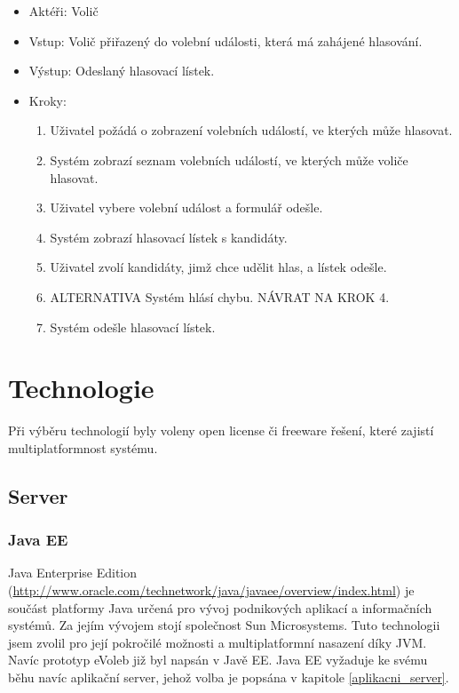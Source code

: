 \documentclass[11pt,twoside,a4paper]{book}
\begin{document}
\begin{itemize}
\item Aktéři: Volič
\item Vstup: Volič přiřazený do volební události, která má zahájené hlasování.
\item Výstup: Odeslaný hlasovací lístek.
\item Kroky:
	\begin{enumerate}
		\item Uživatel požádá o zobrazení volebních událostí, ve kterých může hlasovat.
		\item Systém zobrazí seznam volebních událostí, ve kterých může voliče hlasovat.
		\item Uživatel vybere volební událost a formulář odešle.
		\item Systém zobrazí hlasovací lístek s kandidáty.
		\item Uživatel zvolí kandidáty, jimž chce udělit hlas, a lístek odešle.	
		\item ALTERNATIVA Systém hlásí chybu. NÁVRAT NA KROK 4.
		\item Systém odešle hlasovací lístek.
	\end{enumerate}
\end{itemize}


\section{Technologie}

Při výběru technologií byly voleny open license či freeware řešení, které zajistí multiplatformnost systému.

\subsection{Server}

\subsubsection{Java EE}

Java Enterprise Edition (\url{http://www.oracle.com/technetwork/java/javaee/overview/index.html}) je součást platformy Java určená pro vývoj podnikových aplikací a informačních systémů. Za jejím vývojem stojí společnost Sun Microsystems. Tuto technologii jsem zvolil pro její pokročilé možnosti a multiplatformní nasazení díky JVM.  Navíc prototyp eVoleb již byl napsán v Javě EE. Java EE vyžaduje ke svému běhu navíc aplikační server, jehož volba je popsána v kapitole \ref{aplikacni_server}. 
\end{document}
